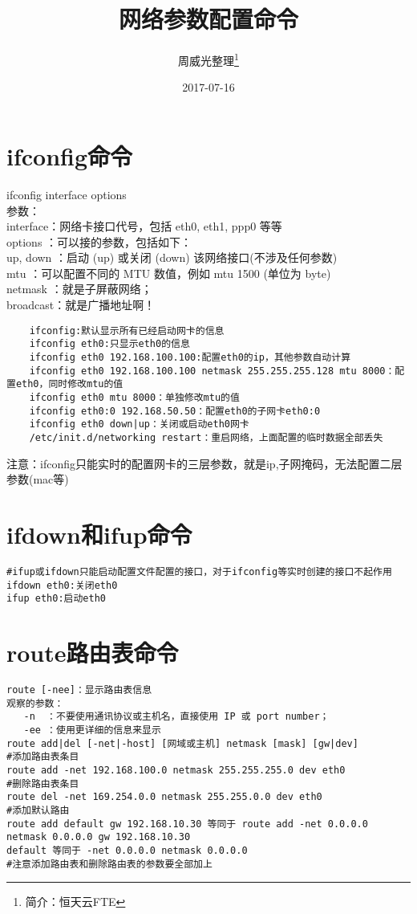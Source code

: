 \documentclass[a4paper,left=1.5cm,right=1.5cm,11pt]{article}
\title{网络参数配置命令}
\author{周威光整理\footnote{简介：恒天云FTE}}
\date{2017-07-16}
\begin{document}
\maketitle
\clearpage
\tableofcontents
\clearpage
\section{ifconfig命令}
ifconfig interface {options}\\
参数：\\
interface：网络卡接口代号，包括 eth0, eth1, ppp0 等等\\
options  ：可以接的参数，包括如下：\\
    up, down ：启动 (up) 或关闭 (down) 该网络接口(不涉及任何参数)\\
    mtu      ：可以配置不同的 MTU 数值，例如 mtu 1500 (单位为 byte)\\
    netmask  ：就是子屏蔽网络；\\
    broadcast：就是广播地址啊！
\begin{lstlisting}
	ifconfig:默认显示所有已经启动网卡的信息
	ifconfig eth0:只显示eth0的信息
	ifconfig eth0 192.168.100.100:配置eth0的ip，其他参数自动计算 
	ifconfig eth0 192.168.100.100 netmask 255.255.255.128 mtu 8000：配置eth0，同时修改mtu的值
	ifconfig eth0 mtu 8000：单独修改mtu的值
	ifconfig eth0:0 192.168.50.50：配置eth0的子网卡eth0:0
	ifconfig eth0 down|up：关闭或启动eth0网卡 
	/etc/init.d/networking restart：重启网络，上面配置的临时数据全部丢失
\end{lstlisting}
注意：ifconfig只能实时的配置网卡的三层参数，就是ip,子网掩码，无法配置二层参数(mac等)
\section{ifdown和ifup命令}
\begin{lstlisting}
#ifup或ifdown只能启动配置文件配置的接口，对于ifconfig等实时创建的接口不起作用
ifdown eth0:关闭eth0
ifup eth0:启动eth0
\end{lstlisting}

\section{route路由表命令}
\begin{lstlisting}
route [-nee]：显示路由表信息
观察的参数：
   -n  ：不要使用通讯协议或主机名，直接使用 IP 或 port number；
   -ee ：使用更详细的信息来显示
route add|del [-net|-host] [网域或主机] netmask [mask] [gw|dev]
#添加路由表条目
route add -net 192.168.100.0 netmask 255.255.255.0 dev eth0
#删除路由表条目
route del -net 169.254.0.0 netmask 255.255.0.0 dev eth0
#添加默认路由
route add default gw 192.168.10.30 等同于 route add -net 0.0.0.0 netmask 0.0.0.0 gw 192.168.10.30
default 等同于 -net 0.0.0.0 netmask 0.0.0.0
#注意添加路由表和删除路由表的参数要全部加上
\end{lstlisting}
\end{document}
